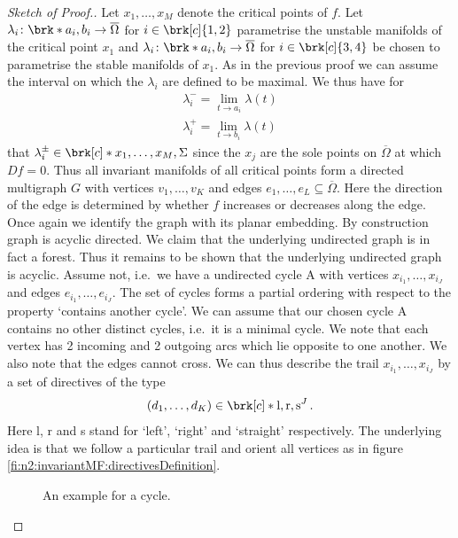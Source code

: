 \begin{proof}[Sketch of Proof.]
  Let $x_1,\dots,x_M$ denote the critical points of $f$. Let $\lambda_i\colon\brk*{a_i,b_i}\to\overline{\Omega}$ for $i\in\brk[c]{1,2}$ parametrise the unstable manifolds of the
  critical point $x_1$ and
  $\lambda_i\colon\brk*{a_i,b_i}\to\overline{\Omega}$ for $i\in\brk[c]{3,4}$ be chosen to parametrise the stable manifolds of $x_1$.
  As in the previous proof we can assume the interval on which the $\lambda_i$ are defined to be maximal. We thus have for
  \begin{align*}
    \lambda_i^-=\lim_{t\to a_i}\lambda(t) \\
    \lambda_i^+=\lim_{t\to b_i}\lambda(t)
  \end{align*}
  that $\lambda_i^\pm\in\brk[c]*{x_1,\dots,x_M,\Sigma}$ since the $x_j$ are the sole points on $\overline{\Omega}$
  at which $Df=0$. Thus all invariant manifolds of all critical points form a directed multigraph $G$ with vertices $v_1,\dots,v_K$ and 
  edges $e_1,\dots,e_L\subseteq\overline{\Omega}$. Here the direction of the edge is determined by whether $f$ increases or decreases
  along the edge.
  Once again we identify the graph with its planar embedding.
  By construction graph is acyclic directed. We claim that the underlying undirected graph is in fact a forest. Thus it remains to
  be shown that the underlying undirected graph is acyclic.
  Assume not, i.e.\ we have a undirected cycle A with vertices $x_{i_1},\dots,x_{i_J}$ and edges $e_{i_1},\dots,e_{i_J}$.
  The set of cycles forms a partial ordering with respect to the property `contains another cycle'.
  We can assume that our chosen cycle A
  contains no other distinct cycles, i.e.\ it is a minimal cycle.
  We note that each vertex has 2 incoming and 2 outgoing arcs which lie opposite to one another.
  We also note that the edges cannot cross. 
  We can thus describe the trail $x_{i_1},\dots,x_{i_J}$ by a set of directives of the type
  \begin{align*}
    (d_1,\dots,d_K) \in \brk[c]*{\text{l},\text{r},\text{s}}^J\,.
  \end{align*}
  Here l, r and s stand for `left', `right' and `straight' respectively.
  The underlying idea is that we follow a particular trail and orient all vertices as in figure \ref{fi:n2:invariantMF:directivesDefinition}.
  
  \begin{figure}
    \centering
    \begin{minipage}{0.4\textwidth}
      \def\svgwidth{0.7\textwidth}
      
      \caption{Explanation of the directives `l',`r' and `r'.}
      \label{fi:n2:invariantMF:directivesDefinition}
    \end{minipage}
    \hfill
    \begin{minipage}{0.4\textwidth}
      \def\svgwidth{1\textwidth}
      
      \caption{An example for a cycle.}
      \label{fi:n2:invariantMF:directivesExample}
    \end{minipage}
  \end{figure}


\end{proof}
